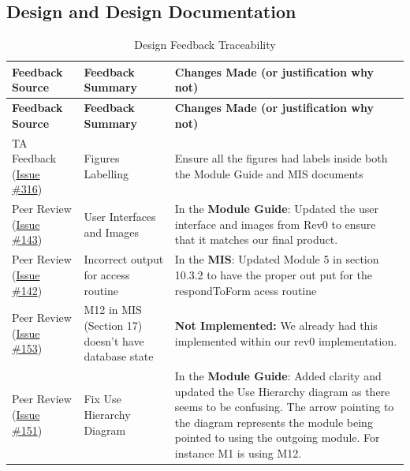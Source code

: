\documentclass{article}
\begin{document}
\subsection{Design and Design Documentation}

\begin{longtable}{|>{\raggedright\arraybackslash}p{}|>{\raggedright\arraybackslash}p{}|>{\raggedright\arraybackslash}p{}|}
\caption{Design Feedback Traceability}
\label{tab:design-feedback-traceability}\\
\hline
\textbf{Feedback Source} & \textbf{Feedback Summary} & \textbf{Changes Made (or justification why not)} \\
\hline
\endfirsthead

\hline
\textbf{Feedback Source} & \textbf{Feedback Summary} & \textbf{Changes Made (or justification why not)} \\
\hline
\endhead

\hline
\endfoot

\hline
\endlastfoot
TA Feedback (\href{https://github.com/VirochaanRG/MES-Event-Management-System/issues/316}{Issue \#316}) & Figures Labelling & Ensure all the figures had labels inside both the Module Guide and MIS documents\\
\hline

Peer Review (\href{https://github.com/VirochaanRG/MES-Event-Management-System/issues/143}{Issue \#143}) &   User Interfaces and Images & In the \textbf{Module Guide}: Updated the user interface and images from Rev0 to ensure that it matches our final product.\\
\hline

Peer Review (\href{https://github.com/VirochaanRG/MES-Event-Management-System/issues/142}{Issue \#142}) &  Incorrect output for access routine & In the \textbf{MIS}: Updated Module 5 in section 10.3.2 to have the proper out put for the respondToForm acess routine\\
\hline

Peer Review (\href{https://github.com/VirochaanRG/MES-Event-Management-System/issues/153}{Issue \#153}) &  M12 in MIS (Section 17) doesn't have database state& \textbf{Not Implemented:} We already had this implemented within our rev0 implementation. \\
\hline

Peer Review (\href{https://github.com/VirochaanRG/MES-Event-Management-System/issues/151}{Issue \#151}) &Fix Use Hierarchy Diagram & In the \textbf{Module Guide}: Added clarity and updated the Use Hierarchy diagram as there seems to be confusing. The arrow pointing to the diagram represents the module being pointed to using the outgoing module. For instance M1 is using M12.\\
\hline


\end{longtable}
\end{document}
